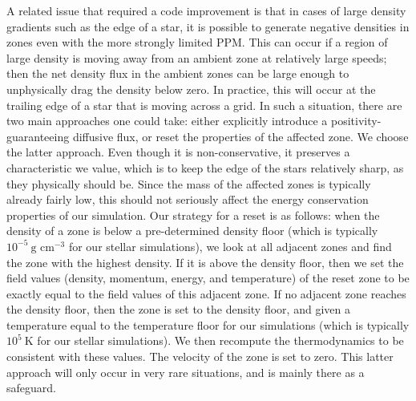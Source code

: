 \documentclass[iop]{../emulateapj}
\begin{document}
A related issue that required a code improvement is that in cases of
large density gradients such as the edge of a star, it is possible to
generate negative densities in zones even with the more strongly
limited PPM. This can occur if a region of large density is moving
away from an ambient zone at relatively large speeds; then the net
density flux in the ambient zones can be large enough to unphysically
drag the density below zero. In practice, this will occur at the
trailing edge of a star that is moving across a grid. In such a
situation, there are two main approaches one could take: either
explicitly introduce a positivity-guaranteeing diffusive flux, or
reset the properties of the affected zone. We choose the latter
approach. Even though it is non-conservative, it preserves a
characteristic we value, which is to keep the edge of the stars
relatively sharp, as they physically should be. Since the mass of the
affected zones is typically already fairly low, this should not
seriously affect the energy conservation properties of our
simulation. Our strategy for a reset is as follows: when the density of 
a zone is below a pre-determined density floor (which is typically 
$10^{-5}\ \text{g cm}^{-3}$ for our stellar simulations), we look
at all adjacent zones and find the zone with the highest density.
If it is above the density floor, then we set the field values 
(density, momentum, energy, and temperature) of the
reset zone to be exactly equal to the field values of this 
adjacent zone. If no adjacent zone reaches the density floor, then
the zone is set to the density floor, and given a temperature equal 
to the temperature floor for our simulations (which is typically 
$10^{5}\ \text{K}$ for our stellar simulations). We then recompute 
the thermodynamics to be consistent with these values. The 
velocity of the zone is set to zero. This latter approach will only
occur in very rare situations, and is mainly there as a safeguard.
\end{document}
